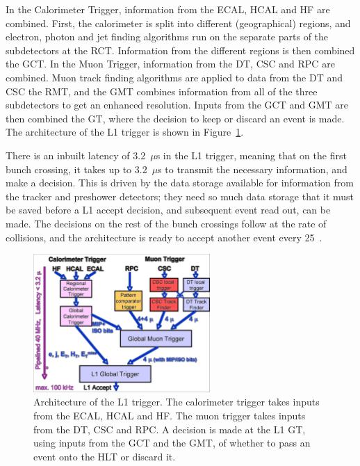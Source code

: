 In the Calorimeter Trigger, information from the \ac{ECAL}, \ac{HCAL} and \ac{HF} are combined.
First, the calorimeter is split into different (geographical) regions, and electron, photon and jet finding algorithms run on the separate parts of the subdetectors at the \ac{RCT}.
Information from the different regions is then combined  the \ac{GCT}. %
In the Muon Trigger, information from the \ac{DT}, \ac{CSC} and \ac{RPC} are combined.  
Muon track finding algorithms are applied to data from the \ac{DT} and \ac{CSC}  the \ac{RMT},
and the \ac{GMT} combines information from all of the three subdetectors to get an enhanced resolution.
Inputs from the \ac{GCT} and \ac{GMT} are then combined  the \ac{GT}, 
where the decision to keep or discard an event is made.
The architecture of the L1 trigger is shown in Figure~\ref{fig:L1triggerArch}.

There is an inbuilt latency of 3.2~$\mu$s in the \ac{L1} trigger, meaning that on the first bunch crossing, it takes up to 3.2~$\mu$s to transmit the necessary information, and make a decision. 
This is driven by the data storage available for information from the tracker and preshower detectors; 
they need so much data storage that it must be saved before a \ac{L1} accept decision, and subsequent event read out, can be made.
The decisions on the rest of the bunch crossings follow at the rate of collisions, and the architecture is ready to accept another event every 25~\ns.


\begin{figure}[htbp]
  \begin{center}
  \includegraphics[width=0.6\textwidth]{Figures/detector/L1TriggerArch.pdf}
  \caption{Architecture of the \ac{L1} trigger. The calorimeter trigger takes inputs from the \ac{ECAL}, \ac{HCAL} and \ac{HF}. The muon trigger takes inputs from the \ac{DT}, \ac{CSC} and \ac{RPC}. A decision is made at the L1 \ac{GT}, using inputs from the \ac{GCT} and the \ac{GMT}, of whether to pass an event onto the \ac{HLT} or discard it.
}
  \label{fig:L1triggerArch}
  \end{center}
\end{figure}

